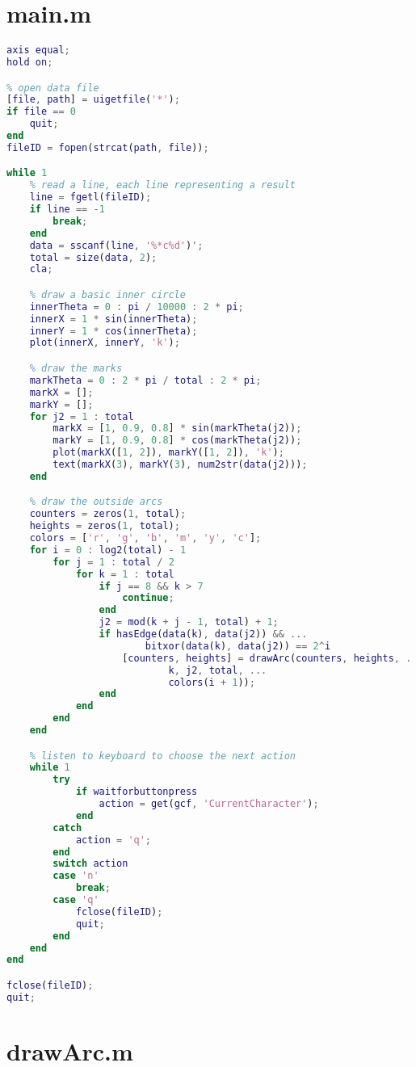 \label{Appendix B}

\section{main.m}
\label{Section B.1}

\begin{lstlisting}[language = Matlab]
axis equal;
hold on;

% open data file
[file, path] = uigetfile('*');
if file == 0
	quit;
end
fileID = fopen(strcat(path, file));

while 1
	% read a line, each line representing a result
	line = fgetl(fileID);
	if line == -1
		break;
	end
	data = sscanf(line, '%*c%d')';
	total = size(data, 2);
	cla;

	% draw a basic inner circle
	innerTheta = 0 : pi / 10000 : 2 * pi;
	innerX = 1 * sin(innerTheta);
	innerY = 1 * cos(innerTheta);
	plot(innerX, innerY, 'k');

	% draw the marks
	markTheta = 0 : 2 * pi / total : 2 * pi;
	markX = [];
	markY = [];
	for j2 = 1 : total
		markX = [1, 0.9, 0.8] * sin(markTheta(j2));
		markY = [1, 0.9, 0.8] * cos(markTheta(j2));
		plot(markX([1, 2]), markY([1, 2]), 'k');
		text(markX(3), markY(3), num2str(data(j2)));
	end

	% draw the outside arcs
	counters = zeros(1, total);
	heights = zeros(1, total);
	colors = ['r', 'g', 'b', 'm', 'y', 'c'];
	for i = 0 : log2(total) - 1
		for j = 1 : total / 2
			for k = 1 : total
				if j == 8 && k > 7
					continue;
				end
				j2 = mod(k + j - 1, total) + 1;
				if hasEdge(data(k), data(j2)) && ...
						bitxor(data(k), data(j2)) == 2^i
					[counters, heights] = drawArc(counters, heights, ...
							k, j2, total, ...
							colors(i + 1));
				end
			end
		end
	end

	% listen to keyboard to choose the next action
	while 1
		try
			if waitforbuttonpress
				action = get(gcf, 'CurrentCharacter');
			end
		catch
			action = 'q';
		end
		switch action
		case 'n'
			break;
		case 'q'
			fclose(fileID);
			quit;
		end
	end
end

fclose(fileID);
quit;
\end{lstlisting}

\clearpage
\section{drawArc.m}
\label{Section B.2}

